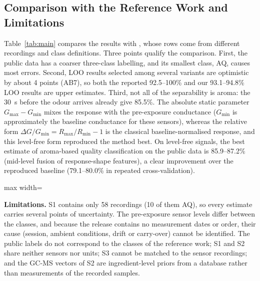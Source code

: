 \documentclass[12pt]{article}
\begin{document}
\subsection{Comparison with the Reference Work and Limitations}

Table~\ref{tab:main} compares the results with \cite{rodriguez2010electronic}, whose rows come from different recordings and class definitions. Three points qualify the comparison. First, the public data has a coarser three-class labelling, and its smallest class, AQ, causes most errors. Second, LOO results selected among several variants are optimistic by about 4 points (AB7), so both the reported 92.5--100\% and our 93.1--94.8\% LOO results are upper estimates. Third, not all of the separability is aroma: the 30~s before the odour arrives already give 85.5\%. The absolute static parameter $G_{\max} - G_{\min}$ mixes the response with the pre-exposure conductance ($G_{\min}$ is approximately the baseline conductance for these sensors), whereas the relative form $\Delta G/G_{\min} = R_{\max}/R_{\min} - 1$ is the classical baseline-normalised response, and this level-free form reproduced the method best. On level-free signals, the best estimate of aroma-based quality classification on the public data is 85.9--87.2\% (mid-level fusion of response-shape features), a clear improvement over the reproduced baseline (79.1--80.0\% in repeated cross-validation).

\begin{table}[!htbp]
\centering
\caption[Comparison with the reference work]{Comparison with the reference work. For S1, the accuracy is given as LOO / repeated five-fold cross-validation.}
\label{tab:main}
\footnotesize
\begin{adjustbox}{max width=\textwidth}

\end{adjustbox}
\end{table}

\textbf{Limitations.} S1 contains only 58 recordings (10 of them AQ), so every estimate carries several points of uncertainty. The pre-exposure sensor levels differ between the classes, and because the release contains no measurement dates or order, their cause (session, ambient conditions, drift or carry-over) cannot be identified. The public labels do not correspond to the classes of the reference work; S1 and S2 share neither sensors nor units; S3 cannot be matched to the sensor recordings; and the GC-MS vectors of S2 are ingredient-level priors from a database rather than measurements of the recorded samples.
\clearpage
\end{document}
